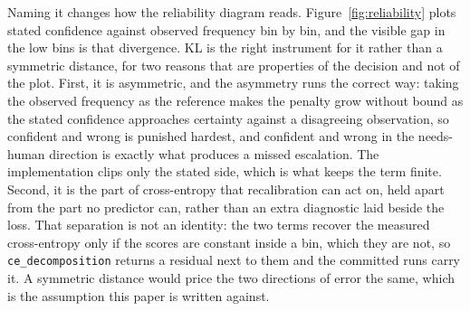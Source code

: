 \documentclass{article}
\begin{document}
Naming it changes how the reliability diagram reads.
Figure~\ref{fig:reliability} plots stated confidence against observed frequency bin
by bin, and the visible gap in the low bins is that divergence. KL is the right
instrument for it rather than a symmetric distance, for two reasons that are
properties of the decision and not of the plot. First, it is asymmetric, and the
asymmetry runs the correct way: taking the observed frequency as the reference makes
the penalty grow without bound as the stated confidence approaches certainty against
a disagreeing observation, so confident and wrong is punished hardest, and confident
and wrong in the needs-human direction is exactly what produces a missed escalation.
The implementation clips only the stated side, which is what keeps the term finite.
Second, it is the part of cross-entropy that recalibration can act on, held apart from
the part no predictor can, rather than an extra diagnostic laid beside the loss. That
separation is not an identity: the two terms recover the measured cross-entropy only
if the scores are constant inside a bin, which they are not, so
\texttt{ce\_decomposition} returns a residual next to them and the committed runs
carry it. A symmetric distance would price the two directions of error the same,
which is the assumption this paper is written against.



\end{document}

